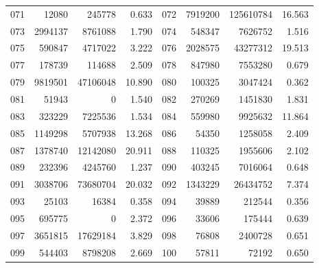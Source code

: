 \begin{longtable}{lrrr@{\hspace{16bp}}lrrr}
071 & 12080 & 245778 & 0.633 & 072 & 7919200 & 125610784 & 16.563\\
073 & 2994137 & 8761088 & 1.790 & 074 & 548347 & 7626752 & 1.516\\
075 & 590847 & 4717022 & 3.222 & 076 & 2028575 & 43277312 & 19.513\\
077 & 178739 & 114688 & 2.509 & 078 & 847980 & 7553280 & 0.679\\
079 & 9819501 & 47106048 & 10.890 & 080 & 100325 & 3047424 & 0.362\\
081 & 51943 & 0 & 1.540 & 082 & 270269 & 1451830 & 1.831\\
083 & 323229 & 7225536 & 1.534 & 084 & 559980 & 9925632 & 11.864\\
085 & 1149298 & 5707938 & 13.268 & 086 & 54350 & 1258058 & 2.409\\
087 & 1378740 & 12142080 & 20.911 & 088 & 110325 & 1955606 & 2.102\\
089 & 232396 & 4245760 & 1.237 & 090 & 403245 & 7016064 & 0.648\\
091 & 3038706 & 73680704 & 20.032 & 092 & 1343229 & 26434752 & 7.374\\
093 & 25103 & 16384 & 0.358 & 094 & 39889 & 212544 & 0.356\\
095 & 695775 & 0 & 2.372 & 096 & 33606 & 175444 & 0.639\\
097 & 3651815 & 17629184 & 3.829 & 098 & 76808 & 2400728 & 0.651\\
099 & 544403 & 8798208 & 2.669 & 100 & 57811 & 72192 & 0.650\\
\end{longtable}

